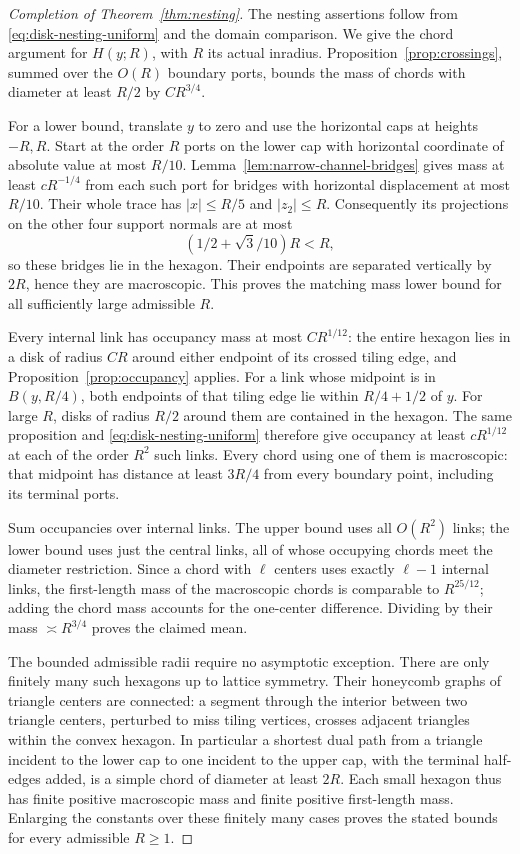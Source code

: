 \begin{proof}[Completion of Theorem~\ref{thm:nesting}]
The nesting assertions follow from \eqref{eq:disk-nesting-uniform} and the domain comparison. We give the chord argument for $H(y;R)$, with $R$ its actual inradius. Proposition~\ref{prop:crossings}, summed over the $O(R)$ boundary ports, bounds the mass of chords with diameter at least $R/2$ by $CR^{3/4}$.

For a lower bound, translate $y$ to zero and use the horizontal caps at heights $-R,R$. Start at the order $R$ ports on the lower cap with horizontal coordinate of absolute value at most $R/10$. Lemma~\ref{lem:narrow-channel-bridges} gives mass at least $cR^{-1/4}$ from each such port for bridges with horizontal displacement at most $R/10$. Their whole trace has $|x|\le R/5$ and $|z_2|\le R$. Consequently its projections on the other four support normals are at most
\[
 (1/2+\sqrt3/10)R<R,
\]
so these bridges lie in the hexagon. Their endpoints are separated vertically by $2R$, hence they are macroscopic. This proves the matching mass lower bound for all sufficiently large admissible $R$.

Every internal link has occupancy mass at most $CR^{1/12}$: the entire hexagon lies in a disk of radius $CR$ around either endpoint of its crossed tiling edge, and Proposition~\ref{prop:occupancy} applies. For a link whose midpoint is in $B(y,R/4)$, both endpoints of that tiling edge lie within $R/4+1/2$ of $y$. For large $R$, disks of radius $R/2$ around them are contained in the hexagon. The same proposition and \eqref{eq:disk-nesting-uniform} therefore give occupancy at least $cR^{1/12}$ at each of the order $R^2$ such links. Every chord using one of them is macroscopic: that midpoint has distance at least $3R/4$ from every boundary point, including its terminal ports.

Sum occupancies over internal links. The upper bound uses all $O(R^2)$ links; the lower bound uses just the central links, all of whose occupying chords meet the diameter restriction. Since a chord with $\ell$ centers uses exactly $\ell-1$ internal links, the first-length mass of the macroscopic chords is comparable to $R^{25/12}$; adding the chord mass accounts for the one-center difference. Dividing by their mass $\asymp R^{3/4}$ proves the claimed mean.

The bounded admissible radii require no asymptotic exception. There are only finitely many such hexagons up to lattice symmetry. Their honeycomb graphs of triangle centers are connected: a segment through the interior between two triangle centers, perturbed to miss tiling vertices, crosses adjacent triangles within the convex hexagon. In particular a shortest dual path from a triangle incident to the lower cap to one incident to the upper cap, with the terminal half-edges added, is a simple chord of diameter at least $2R$. Each small hexagon thus has finite positive macroscopic mass and finite positive first-length mass. Enlarging the constants over these finitely many cases proves the stated bounds for every admissible $R\ge1$.
\end{proof}

